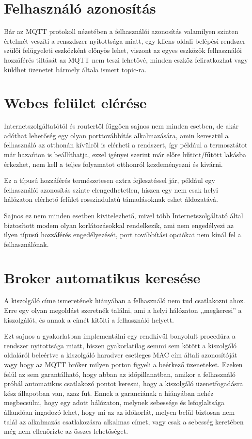 \documentclass[
]{thesis-ekf}
\theoremstyle{definition}
\theoremstyle{remark}
\begin{document}
\section{Felhasználó azonosítás}
Bár az MQTT protokoll nézetében a felhasználói azonosítás valamilyen szinten értelmét veszíti
a renszdszer nyitottsága miatt, egy kliens oldali belépési rendszer szülői felügyeleti
eszközként előnyös lehet, viszont az egyes eszközök felhasználói hozzáférés tiltását az MQTT
nem teszi lehetővé, minden eszköz feliratkozhat vagy küldhet üzenetet bármely általa ismert
topic-ra.

\section{Webes felület elérése}
Internetszolgáltatótól és routertől függően sajnos nem minden esetben, de akár adóthat lehetőség egy olyan
porttovábbítás alkalmazására, amin keresztül a felhasználó az otthonán kívülről is elérheti a rendszert,
így például a termosztátot már hazaúton is beállíthatja, ezzel igényei szerint már előre hűtött/fűtött lakásba
érkezhet, nem kell a teljes folyamatot otthonról kezdeményezni és kivárni.

Ez a típusú hozzáférés természetesen extra fejlesztéssel jár, például egy felhasználói azonosítás
szinte elengedhetetlen, hiszen egy nem csak helyi hálózaton elérhető felület rosszindulatú támadásoknak
eshet áldozatává.

Sajnos ez nem minden esetben kivitelezhető, mivel több Internetszolgáltató által biztosított modem
olyan korlátozásokkal rendelkezik, ami nem engedélyezi az ilyen típusú hozzáférés engedélyezését,
port továbbítási opciókat nem kínál fel a felhasználónak.

\section{Broker automatikus keresése}
A kiszolgáló címe ismeretének hiányában a felhasználó nem tud csatlakozni ahoz. Erre egy olyan megoldást
szeretnék találni, ami a helyi hálózaton ,,megkeresi'' a kiszolgálót, és annak a címét kitölti a felhasználó helyett.

Ezt sajnos a gyakorlatban implementálni egy rendkívül bonyolult procedúra a rendszer nyitottsága miatt, hiszen
gyakorlatilag semmi sem kötött a kiszolgáló oldaláról beleértve a kiszolgáló haradver esetleges MAC cím általi
azonosítóját vagy hogy az MQTT bróker milyen porton figyeli a beérkező üzeneteket. Ezeken felül az sem garantálható,
hogy abban az időpillanatban, amikor a felhasználó próbál automatikus csatlakozó pontot keresni, hogy a kiszolgáló
üzenetfogadásra kész állapotban van, azaz fut. Ennek a garanciának a hiányában nehéz megbecsülni, hogy
egy adott hálózaton, melynek sebessége és lefoglaltsága állandóan ingadozó lehet, hogy mi az az időkorlát,
melyen belül biztosan nem talál az alkalmazás csatlakozásra alkalmas címet, vagy csak a sebesség keretében
még nem ellenőrizte az összes lehetőséget.
\end{document}
